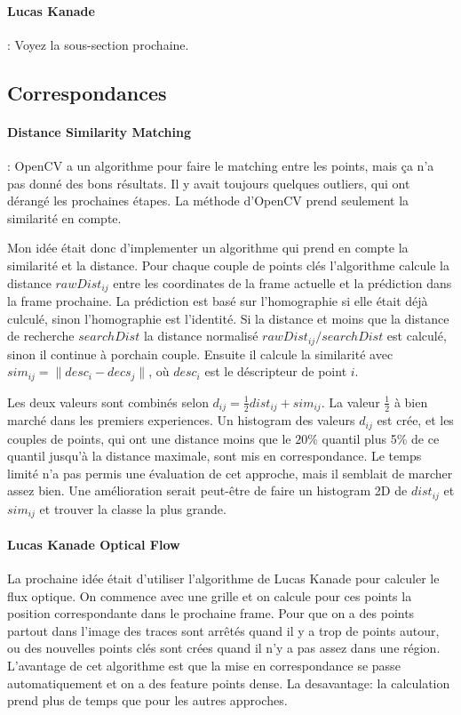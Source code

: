 \documentclass[8pt,twoside=off,titlepage=false, twocolumn]{scrartcl}
\begin{document}
\paragraph{Lucas Kanade} : Voyez la sous-section prochaine.

\subsection{Correspondances}

\paragraph{Distance Similarity Matching}: OpenCV a un algorithme pour faire le matching entre les points, mais ça n'a pas donné des bons résultats. Il y avait toujours quelques outliers, qui ont dérangé les prochaines étapes. La méthode d'OpenCV prend seulement la similarité en compte.

Mon idée était donc d'implementer un algorithme qui prend en compte la similarité et la distance. Pour chaque couple de points clés l'algorithme calcule la distance $rawDist_{ij} $ entre les coordinates de la frame actuelle et la prédiction dans la frame prochaine. La prédiction est basé sur l'homographie si elle était déjà culculé, sinon l'homographie est l'identité. Si la distance et moins que la distance de recherche $searchDist$ la distance normalisé $rawDist_{ij} / searchDist$ est calculé, sinon il continue à porchain couple. Ensuite il calcule la similarité avec $sim_{ij} = \| desc_i - decs_j \|$, où $desc_i$ est le déscripteur de point $i$. 

Les deux valeurs sont combinés selon $d_{ij} = \frac{1}{2} dist_{ij} + sim_{ij}$. La valeur $\frac{1}{2}$ à bien marché dans les premiers experiences. Un histogram des valeurs $d_{ij}$ est crée, et les couples de points, qui ont une distance moins que le $20\%$ quantil plus 5\% de ce quantil jusqu'à la distance maximale, sont mis en correspondance. Le temps limité n'a pas permis une évaluation de cet approche, mais il semblait de marcher assez bien. Une amélioration serait peut-être de faire un histogram 2D de $dist_{ij}$ et $sim_{ij}$ et trouver la classe la plus grande.

\paragraph{Lucas Kanade Optical Flow}

La prochaine idée était d'utiliser l'algorithme de Lucas Kanade pour calculer le flux optique. On commence avec une grille et on calcule pour ces points la position correspondante dans le prochaine frame. Pour que on a des points partout dans l'image des traces sont arrêtés quand il y a trop de points autour, ou des nouvelles points clés sont crées quand il n'y a pas assez dans une région. L'avantage de cet algorithme est que la mise en correspondance se passe automatiquement et on a des feature points dense. La desavantage: la calculation prend plus de temps que pour les autres approches.
\end{document}
